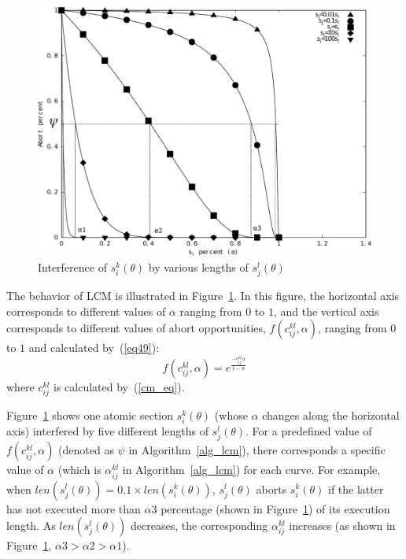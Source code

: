 \documentclass[letter]{sig-alternate}
\begin{document}
%
\begin{figure}[htbp]
\centering
\includegraphics[scale=0.4]{figures/figure16}
\caption{\label{fig16}Interference of $s_{i}^{k}(\theta)$ by various lengths of 
$s_{j}^{l}(\theta)$}
\end{figure}

The behavior of LCM is illustrated in Figure~\ref{fig16}. In this figure, the horizontal axis corresponds to different values of $\alpha$ ranging from $0$ to $1$, and the vertical axis corresponds to different values of abort opportunities, $f(c_{ij}^{kl},\alpha)$, ranging from $0$ to $1$ and calculated by~(\ref{eq49}):
\begin{equation}
f(c_{ij}^{kl},\alpha)=e^{\frac{-c_{ij}^{kl}\alpha}{1-\alpha}}
\label{eq49}\end{equation}
where $c_{ij}^{kl}$ is calculated by~(\ref{cm_eq}).

Figure~\ref{fig16} shows one atomic section $s_i^k(\theta)$ (whose $\alpha$ changes along the horizontal axis) interfered by five different lengths of $s_j^l(\theta)$.
For a predefined value of $f(c_{ij}^{kl},\alpha)$ (denoted as $\psi$ in Algorithm~\ref{alg_lcm}), there corresponds a specific value of $\alpha$ (which is $\alpha_{ij}^{kl}$ in Algorithm~\ref{alg_lcm}) for each curve. For example, when $len(s_j^l(\theta))=0.1 \times len(s_i^k(\theta))$, $s_j^l(\theta)$ aborts $s_i^k(\theta)$ if the latter has not executed more than $\alpha3$ percentage (shown in Figure~\ref{fig16}) of its execution length. As $len(s_{j}^{l}(\theta))$ decreases, the corresponding $\alpha_{ij}^{kl}$ increases (as shown in Figure~\ref{fig16}, $\alpha3>\alpha2>\alpha1$).
\end{document}
